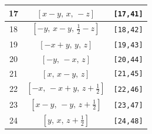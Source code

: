 \documentclass[fleqn,8pt]{jsarticle}
\begin{document}
\begin{longtable}{ccc}
17 & $\left[ x - y,\, x,\, - z \right]$ & {\tt [17,41]} \\ \hline
18 & $\left[ - y,\, x - y,\, \frac{1}{2} - z \right]$ & {\tt [18,42]} \\ \hline
19 & $\left[ - x + y,\, y,\, z \right]$ & {\tt [19,43]} \\ \hline
20 & $\left[ - y,\, - x,\, z \right]$ & {\tt [20,44]} \\ \hline
21 & $\left[ x,\, x - y,\, z \right]$ & {\tt [21,45]} \\ \hline
22 & $\left[ - x,\, - x + y,\, z + \frac{1}{2} \right]$ & {\tt [22,46]} \\ \hline
23 & $\left[ x - y,\, - y,\, z + \frac{1}{2} \right]$ & {\tt [23,47]} \\ \hline
24 & $\left[ y,\, x,\, z + \frac{1}{2} \right]$ & {\tt [24,48]} \\
\end{longtable}
\end{document}
